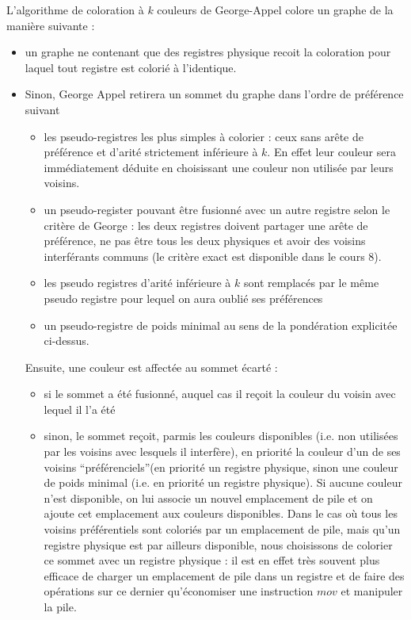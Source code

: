 L'algorithme de coloration \`a $k$ couleurs de George-Appel colore un graphe de la mani\`ere suivante :
\begin{itemize}
\item un graphe ne contenant que des registres physique recoit la coloration pour laquel tout registre est colori\'e \`a l'identique.
\item Sinon, George Appel retirera un sommet du graphe dans l'ordre de pr\'ef\'erence suivant
  \begin{itemize}
  \item les pseudo-registres les plus simples \`a colorier : ceux sans arête de pr\'ef\'erence et d'arit\'e strictement inf\'erieure \`a $k$. En effet leur couleur sera imm\'ediatement d\'eduite en choisissant une couleur non utilis\'ee par leurs voisins.
  \item un pseudo-register pouvant être fusionn\'e avec un autre registre selon le crit\`ere de George : les deux registres doivent partager une arête de pr\'ef\'erence, ne pas être tous les deux physiques et avoir des voisins interf\'erants communs (le crit\`ere exact est disponible dans le cours 8).
  \item les pseudo registres d'arit\'e inf\'erieure \`a $k$ sont remplac\'es par le même pseudo registre pour lequel on aura oubli\'e ses pr\'ef\'erences
  \item un pseudo-registre de poids minimal au sens de la pond\'eration explicit\'ee ci-dessus.
  \end{itemize}
  Ensuite, une couleur est affect\'ee au sommet \'ecart\'e :
  \begin{itemize}
  \item si le sommet a \'et\'e fusionn\'e, auquel cas il reçoit la couleur du voisin avec lequel il l'a \'et\'e
  \item sinon, le sommet reçoit, parmis les couleurs disponibles (i.e. non utilis\'ees par les voisins avec lesquels il interf\`ere), en priorit\'e la couleur d'un de ses voisins ``pr\'ef\'erenciels''(en priorit\'e un registre physique, sinon une couleur de poids minimal (i.e. en priorit\'e un registre physique). Si aucune couleur n'est disponible, on lui associe un nouvel emplacement de pile et on ajoute cet emplacement aux couleurs disponibles. Dans le cas où tous les voisins pr\'ef\'erentiels sont colori\'es par un emplacement de pile, mais qu'un registre physique est par ailleurs disponible, nous choisissons de colorier ce sommet avec un registre physique : il est en effet tr\`es souvent plus efficace de charger un emplacement de pile dans un registre et de faire des op\'erations sur ce dernier qu'\'economiser une instruction $mov$ et manipuler la pile.
  \end{itemize}
\end{itemize}

